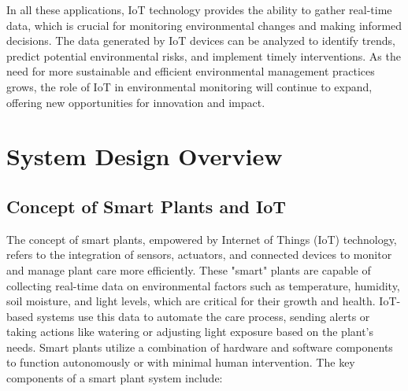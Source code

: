 \documentclass[12pt,a4paper,oneside,english]{book}
\begin{document}
In all these applications, IoT technology provides the ability to gather real-time data, which is crucial for monitoring environmental changes and making informed decisions. The data generated by IoT devices can be analyzed to identify trends, predict potential environmental risks, and implement timely interventions. As the need for more sustainable and efficient environmental management practices grows, the role of IoT in environmental monitoring will continue to expand, offering new opportunities for innovation and impact.

\section{System Design Overview}
\subsection{Concept of Smart Plants and IoT}
The concept of smart plants, empowered by Internet of Things (IoT) technology, refers to the integration of sensors, actuators, and connected devices to monitor and manage plant care more efficiently. These "smart" plants are capable of collecting real-time data on environmental factors such as temperature, humidity, soil moisture, and light levels, which are critical for their growth and health. IoT-based systems use this data to automate the care process, sending alerts or taking actions like watering or adjusting light exposure based on the plant's needs.
Smart plants utilize a combination of hardware and software components to function autonomously or with minimal human intervention. The key components of a smart plant system include:
\end{document}

